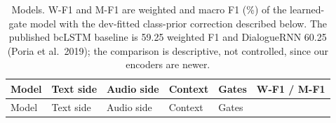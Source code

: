\documentclass[
  10pt,
]{article}
\begin{document}
\begin{longtable}[]{@{}
  >{\raggedright\arraybackslash}p{}
  >{\raggedright\arraybackslash}p{}
  >{\raggedright\arraybackslash}p{}
  >{\raggedright\arraybackslash}p{}
  >{\raggedright\arraybackslash}p{}
  >{\raggedright\arraybackslash}p{}@{}}
\caption{Models. W-F1 and M-F1 are weighted and macro F1 (\%) of the
learned-gate model with the dev-fitted class-prior correction described
below. The published bcLSTM baseline is 59.25 weighted F1 and
DialogueRNN 60.25 (Poria et al.~2019); the comparison is descriptive,
not controlled, since our encoders are newer.}\tabularnewline
\toprule\noalign{}
\begin{minipage}[b]{\linewidth}\raggedright
Model
\end{minipage} & \begin{minipage}[b]{\linewidth}\raggedright
Text side
\end{minipage} & \begin{minipage}[b]{\linewidth}\raggedright
Audio side
\end{minipage} & \begin{minipage}[b]{\linewidth}\raggedright
Context
\end{minipage} & \begin{minipage}[b]{\linewidth}\raggedright
Gates
\end{minipage} & \begin{minipage}[b]{\linewidth}\raggedright
W-F1 / M-F1
\end{minipage} \\
\midrule\noalign{}
\endfirsthead
\toprule\noalign{}
\begin{minipage}[b]{\linewidth}\raggedright
Model
\end{minipage} & \begin{minipage}[b]{\linewidth}\raggedright
Text side
\end{minipage} & \begin{minipage}[b]{\linewidth}\raggedright
Audio side
\end{minipage} & \begin{minipage}[b]{\linewidth}\raggedright
Context
\end{minipage} & \begin{minipage}[b]{\linewidth}\raggedright
Gates
\end{minipage} & \begin{minipage}[b]{\linewidth}\raggedright

\end{minipage}
\end{longtable}
\end{document}
